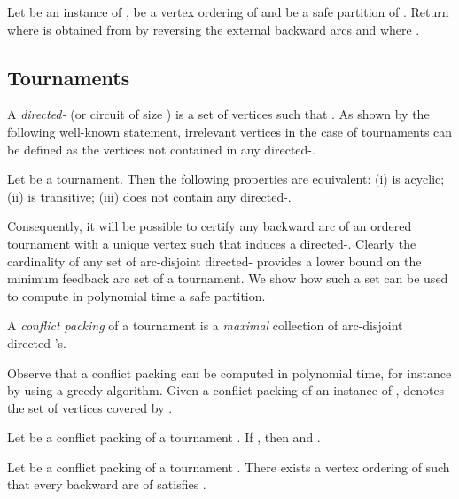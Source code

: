 \begin{polyrule} \label{rule:safepartition}
Let  be an instance of \FAS{},  be a vertex ordering of  and  be a safe partition of  . Return  where  is obtained from  by reversing the external backward arcs  and where .
\end{polyrule}


\subsection{Tournaments}

A \emph{directed-} (or circuit of size ) is a set of vertices  such that . As shown by the following well-known statement, irrelevant vertices in the case of tournaments can be defined as the vertices not contained in any directed-.

\begin{lemma}[Folklore]
\label{lem:folklore}
Let  be a tournament. Then the following properties are equivalent: (i)  is acyclic; (ii)  is transitive; (iii)  does not contain any directed-.
\end{lemma}

Consequently, it will be possible to certify any backward arc  of an ordered tournament  with a unique vertex  such that  induces a directed-. Clearly the cardinality of any set of arc-disjoint directed- provides a lower bound on the minimum feedback arc set of a tournament. We show how such a set can be used to compute in polynomial time a safe partition. 



\newcommand{\T}{T_{\sigma}}
\newcommand{\V}{V_{\sigma}}

\begin{definition} \label{def:cpfast}
A \emph{conflict packing} of a tournament  is a \emph{maximal} collection of arc-disjoint directed-'s.
\end{definition}

Observe that a conflict packing can be computed in polynomial time, for instance by using a greedy algorithm. Given a conflict packing  of an instance  of \FAST{},  denotes the set of vertices covered by . 

\begin{observation} \label{lem:cpfast}
Let  be a conflict packing of a tournament . If , then  and .
\end{observation}



\begin{lemma} \label{lem:realcpfast}
Let  be a conflict packing of a tournament . There exists a vertex ordering  of  such that every backward arc  of  satisfies .
\end{lemma}


